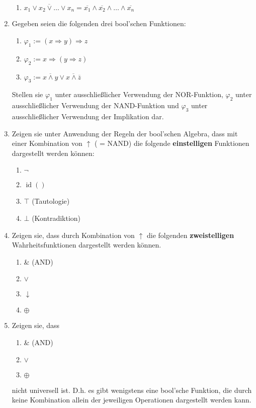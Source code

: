 \documentclass[paper=a4,fontsize=11pt]{scrartcl}%
\numberwithin{equation}{section}
\DeclareMathOperator{\id}{id}
\begin{document}
\begin{enumerate}
\begin{enumerate}
		\item $\overline{x_1 \lor x_2 \lor \ldots \lor x_n} = \overline{x_1} \land \overline{x_2} \land \ldots \land \overline{x_n}$
	\end{enumerate}
	\item Gegeben seien die folgenden drei bool'schen Funktionen:
	\begin{enumerate}
		\item $\varphi_1 := (x \Rightarrow y) \Rightarrow z$
		\item $\varphi_2 := x \Rightarrow (y \Rightarrow z)$
		\item $\varphi_3 := \overline{x \land y} \lor \overline{x \land \overline{z}}$
	\end{enumerate}
	Stellen sie $\varphi_1$ unter ausschließlicher Verwendung der NOR-Funktion, $\varphi_2$ unter ausschließlicher Verwendung der NAND-Funktion und $\varphi_3$ unter ausschließlicher Verwendung der Implikation dar.
	\item Zeigen sie unter Anwendung der Regeln der bool'schen Algebra, dass mit einer Kombination von $\uparrow$ ( = NAND) die folgende \textbf{einstelligen} Funktionen dargestellt werden können:
	\begin{enumerate}
		\item $\neg $
		\item $ \id()$
		\item $\top$ (Tautologie)
		\item $\bot$ (Kontradiktion)
	\end{enumerate}
	\item Zeigen sie, dass durch Kombination von $ \uparrow$ die folgenden \textbf{zweistelligen} Wahrheitsfunktionen dargestellt werden können.
	\begin{enumerate}
		\item \& (AND)
		\item $\lor$
		\item $\downarrow$
		\item $\oplus$
	\end{enumerate}
	\item Zeigen sie, dass 
	\begin{enumerate}
		\item \& (AND)
		\item $\lor$
		\item $\oplus$
	\end{enumerate}
	nicht universell ist. D.h. es gibt wenigstens eine bool'sche Funktion, die durch keine Kombination allein der jeweiligen Operationen dargestellt werden kann. 
\end{enumerate}
	
\end{document}
